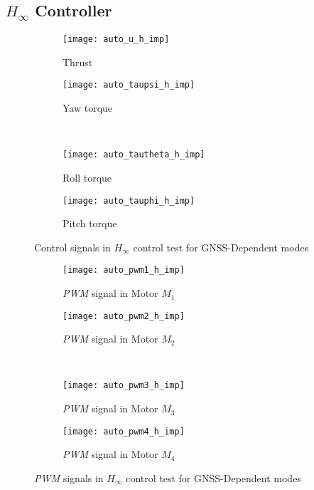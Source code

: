 \begin{appendices}
\subsection*{$H_\infty$ Controller}

\begin{figure}[H]
\begin{subfigure}{.5\linewidth}
\centering
\texttt{[image: auto\_u\_h\_imp]}
\caption{Thrust}
\label{fig:auto_u_h_imp}
\end{subfigure}%
\begin{subfigure}{.5\linewidth}
\centering
\texttt{[image: auto\_taupsi\_h\_imp]}
\caption{Yaw torque}
\label{fig:auto_taupsi_h_imp}
\end{subfigure}\\[1ex]
\begin{subfigure}{0.5\linewidth}
\centering
\texttt{[image: auto\_tautheta\_h\_imp]}
\caption{Roll torque}
\label{fig:auto_tautheta_h_imp}
\end{subfigure}
\begin{subfigure}{0.5\linewidth}
\centering
\texttt{[image: auto\_tauphi\_h\_imp]}
\caption{Pitch torque}
\label{fig:auto_tauphi_h_imp}
\end{subfigure}
\caption{Control signals in $H_\infty$ control test for GNSS-Dependent modes}
\label{fig:auto_control_h}
\end{figure}

\begin{figure}[H]
\begin{subfigure}{.5\linewidth}
\centering
\texttt{[image: auto\_pwm1\_h\_imp]}
\caption{\textit{PWM} signal in Motor $M_1$}
\label{fig:auto_pwm_h_imp}
\end{subfigure}%
\begin{subfigure}{.5\linewidth}
\centering
\texttt{[image: auto\_pwm2\_h\_imp]}
\caption{\textit{PWM} signal in Motor $M_2$}
\label{fig:auto_pwm2_h_imp}
\end{subfigure}\\[1ex]
\begin{subfigure}{0.5\linewidth}
\centering
\texttt{[image: auto\_pwm3\_h\_imp]}
\caption{\textit{PWM} signal in Motor $M_3$}
\label{fig:auto_pwm3_h_imp}
\end{subfigure}
\begin{subfigure}{0.5\linewidth}
\centering
\texttt{[image: auto\_pwm4\_h\_imp]}
\caption{\textit{PWM} signal in Motor $M_4$}
\label{fig:auto_pwm4_h_imp}
\end{subfigure}
\caption{\textit{PWM} signals in $H_\infty$ control test for GNSS-Dependent modes}
\label{fig:auto_pwm_h}
\end{figure}



\end{appendices}